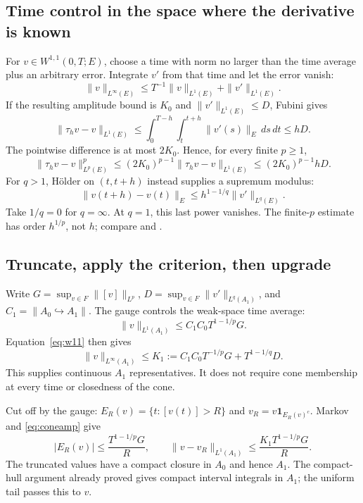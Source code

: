 \documentclass[12pt,reqno]{amsart}
\begin{document}
\subsection{Time control in the space where the derivative is known}

For $v\in W^{1,1}(0,T;E)$, choose a time with norm no larger than the time average plus an arbitrary error. Integrate $v'$ from that time and let the error vanish:
\begin{equation}\label{eq:w11}
\|v\|_{L^\infty(E)}\le T^{-1}\|v\|_{L^1(E)}+\|v'\|_{L^1(E)}.
\end{equation}
If the resulting amplitude bound is $K_0$ and $\|v'\|_{L^1(E)}\le D$, Fubini gives
\begin{equation}\label{eq:l1shift}
\|\tau_hv-v\|_{L^1(E)}
\le\int_0^{T-h}\int_t^{t+h}\|v'(s)\|_E\,ds\,dt\le hD.
\end{equation}
The pointwise difference is at most $2K_0$. Hence, for every finite $p\ge1$,
\begin{equation}\label{eq:pshift}
\|\tau_hv-v\|_{L^p(E)}^p
\le(2K_0)^{p-1}\|\tau_hv-v\|_{L^1(E)}
\le(2K_0)^{p-1}hD.
\end{equation}
For $q>1$, H\"older on $(t,t+h)$ instead supplies a supremum modulus:
\begin{equation}\label{eq:supshift}
\|v(t+h)-v(t)\|_E\le h^{1-1/q}\|v'\|_{L^q(E)}.
\end{equation}
Take $1/q=0$ for $q=\infty$. At $q=1$, this last power vanishes. The finite-$p$ estimate has order $h^{1/p}$, not $h$; compare \cite[Lemma 4, pp.~77--78]{S-simon} and \cite[Corollary 2.4, p.~1730]{S-maitre}.
\subsection{Truncate, apply the criterion, then upgrade}

Write $G=\sup_{v\in F}\|[v]\|_{L^p}$, $D=\sup_{v\in F}\|v'\|_{L^q(A_1)}$, and $C_1=\|A_0\hookrightarrow A_1\|$. The gauge controls the weak-space time average:
\[
\|v\|_{L^1(A_1)}\le C_1C_0T^{1-1/p}G.
\]
Equation~\eqref{eq:w11} then gives
\begin{equation}\label{eq:coneamp}
\|v\|_{L^\infty(A_1)}\le K_1:=C_1C_0T^{-1/p}G+T^{1-1/q}D.
\end{equation}
This supplies continuous $A_1$ representatives. It does not require cone membership at every time or closedness of the cone.

Cut off by the gauge: $E_R(v)=\{t:[v(t)]>R\}$ and $v_R=v\mathbf1_{E_R(v)^c}$. Markov and \eqref{eq:coneamp} give
\begin{equation}\label{eq:conetail}
|E_R(v)|\le\frac{T^{1-1/p}G}{R},\qquad
\|v-v_R\|_{L^1(A_1)}\le\frac{K_1T^{1-1/p}G}{R}.
\end{equation}
The truncated values have a compact closure in $A_0$ and hence $A_1$. The compact-hull argument already proved gives compact interval integrals in $A_1$; the uniform tail passes this to $v$.
\end{document}
